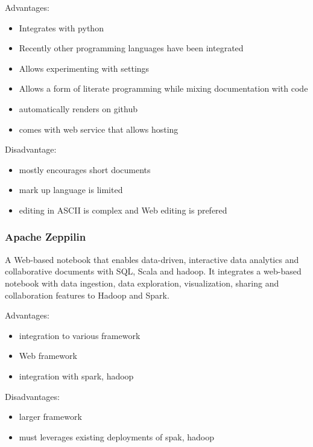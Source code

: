 Advantages:

\begin{itemize}
\tightlist
\item
  Integrates with python
\item
  Recently other programming languages have been integrated
\item
  Allows experimenting with settings
\item
  Allows a form of literate programming while mixing documentation with
  code
\item
  automatically renders on github
\item
  comes with web service that allows hosting
\end{itemize}

Disadvantage:

\begin{itemize}
\tightlist
\item
  mostly encourages short documents
\item
  mark up language is limited
\item
  editing in ASCII is complex and Web editing is prefered
\end{itemize}

\subsubsection{Apache Zeppilin}\label{apache-zeppilin}

A Web-based notebook that enables data-driven, interactive data
analytics and collaborative documents with SQL, Scala and hadoop. It
integrates a web-based notebook with data ingestion, data exploration,
visualization, sharing and collaboration features to Hadoop and Spark.

Advantages:

\begin{itemize}
\tightlist
\item
  integration to various framework
\item
  Web framework
\item
  integration with spark, hadoop
\end{itemize}

Disadvantages:

\begin{itemize}
\tightlist
\item
  larger framework
\item
  must leverages existing deployments of spak, hadoop
\end{itemize}


